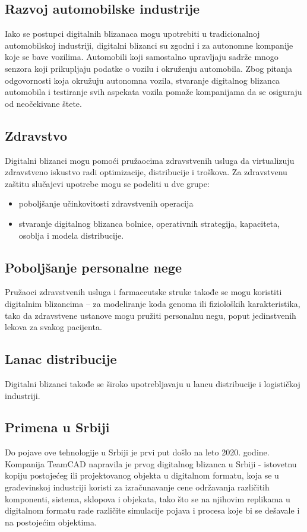 \documentclass[a4paper]{article}
\begin{document}
{\subsection{Razvoj automobilske industrije}
Iako se postupci digitalnih blizanaca mogu upotrebiti u tradicionalnoj automobilskoj industriji,
digitalni blizanci su zgodni i za autonomne kompanije koje se bave vozilima. Automobili koji
samostalno upravljaju sadrže mnogo senzora koji prikupljaju podatke o vozilu i okruženju
automobila. Zbog pitanja odgovornosti koja okružuju autonomna vozila, stvaranje digitalnog
blizanca automobila i testiranje svih aspekata vozila pomaže kompanijama da se osiguraju od
neočekivane štete.\cite{lider}

\subsection{Zdravstvo}
Digitalni blizanci mogu pomoći pružaocima zdravstvenih usluga da virtualizuju zdravstveno
iskustvo radi optimizacije, distribucije i troškova. Za zdravstvenu zaštitu slučajevi upotrebe mogu
se podeliti u dve grupe:
\begin{itemize}
\item poboljšanje učinkovitosti zdravstvenih operacija
\item stvaranje digitalnog blizanca bolnice, operativnih strategija, kapaciteta, osoblja i modela
distribucije.\cite{lider}
\end{itemize}

\subsection{Poboljšanje personalne nege}
Pružaoci zdravstvenih usluga i farmaceutske struke takođe se mogu koristiti digitalnim
blizancima – za modeliranje koda genoma ili fizioloških karakteristika, tako da zdravstvene
ustanove mogu pružiti personalnu negu, poput jedinstvenih lekova za svakog pacijenta. \cite{lider}

\subsection{Lanac distribucije}
Digitalni blizanci takođe se široko upotrebljavaju u lancu distribucije i logističkoj industriji.\cite{lider}

\subsection{Primena u Srbiji}
Do pojave ove tehnologije u Srbiji je prvi put došlo na leto 2020. godine. Kompanija TeamCAD
napravila je prvog digitalnog blizanca u Srbiji - istovetnu kopiju postojećeg ili projektovanog
objekta u digitalnom formatu, koja se u građevinskoj industriji koristi za izračunavanje cene
održavanja različitih komponenti, sistema, sklopova i objekata, tako što se na njihovim
replikama u digitalnom formatu rade različite simulacije pojava i procesa koje bi se dešavale i na
postojećim objektima.\cite{smartconnecting}

}
\end{document}
